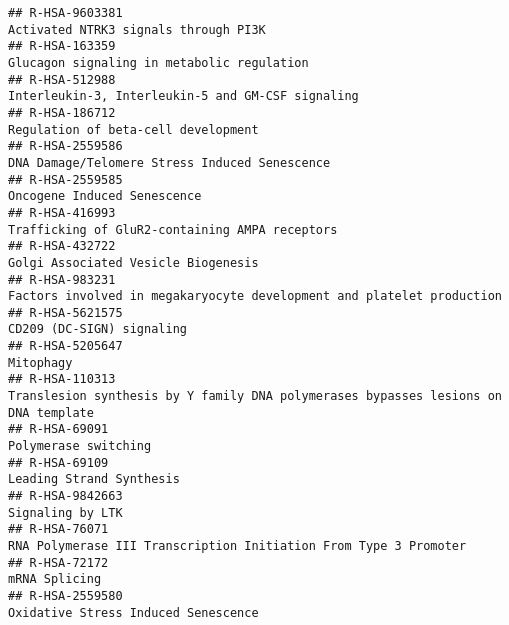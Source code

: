\documentclass[
]{article}
\begin{document}
\begin{verbatim}
## R-HSA-9603381                                                                                                 Activated NTRK3 signals through PI3K
## R-HSA-163359                                                                                            Glucagon signaling in metabolic regulation
## R-HSA-512988                                                                                     Interleukin-3, Interleukin-5 and GM-CSF signaling
## R-HSA-186712                                                                                                   Regulation of beta-cell development
## R-HSA-2559586                                                                                        DNA Damage/Telomere Stress Induced Senescence
## R-HSA-2559585                                                                                                          Oncogene Induced Senescence
## R-HSA-416993                                                                                        Trafficking of GluR2-containing AMPA receptors
## R-HSA-432722                                                                                                   Golgi Associated Vesicle Biogenesis
## R-HSA-983231                                                                 Factors involved in megakaryocyte development and platelet production
## R-HSA-5621575                                                                                                            CD209 (DC-SIGN) signaling
## R-HSA-5205647                                                                                                                            Mitophagy
## R-HSA-110313                                                    Translesion synthesis by Y family DNA polymerases bypasses lesions on DNA template
## R-HSA-69091                                                                                                                   Polymerase switching
## R-HSA-69109                                                                                                               Leading Strand Synthesis
## R-HSA-9842663                                                                                                                     Signaling by LTK
## R-HSA-76071                                                                       RNA Polymerase III Transcription Initiation From Type 3 Promoter
## R-HSA-72172                                                                                                                          mRNA Splicing
## R-HSA-2559580                                                                                                  Oxidative Stress Induced Senescence

\end{verbatim}
\end{document}
